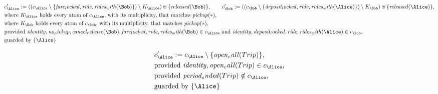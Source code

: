\begin{align*}
&
c'_
{
\Alice
}
 := 
(
(c_
{
\Alice
}
 \setminus 
\{
\mathit{
fare_locked
}
,
\mathit{
ride
}
,
\mathit{
rides_with
}
(
\Bob
)
\}
) \setminus K_
{
\Alice
}
) \uplus 
\{
\mathit{
released
}
(
\Bob
)
\}
, \qquad 
c'_
{
\Bob
}
 := 
(
(c_
{
\Bob
}
 \setminus 
\{
\mathit{
deposit_locked
}
,
\mathit{
ride
}
,
\mathit{
rides_with
}
(
\Alice
)
\}
) \setminus K_
{
\Bob
}
) \uplus 
\{
\mathit{
released
}
(
\Alice
)
\}
,\\
&
\text{where } K_
{
\Alice
}
 \text{ holds every atom of } c_
{
\Alice
}
 \text{, with its multiplicity, that matches } 
\mathit{
pickup
}
(
\ast
)
,\\
&
\text{where } K_
{
\Bob
}
 \text{ holds every atom of } c_
{
\Bob
}
 \text{, with its multiplicity, that matches } 
\mathit{
pickup
}
(
\ast
)
,\\
&
\text{provided } 
\mathit{
identity
}
,
\mathit{
no_pickup
}
,
\mathit{
cancel_release
}
(
\Bob
)
,
\mathit{
fare_locked
}
,
\mathit{
ride
}
,
\mathit{
rides_with
}
(
\Bob
)
 \in c_
{
\Alice
}
 \text{ and } 
\mathit{
identity
}
,
\mathit{
deposit_locked
}
,
\mathit{
ride
}
,
\mathit{
rides_with
}
(
\Alice
)
 \in c_
{
\Bob
}
,\\
&
\text{guarded by } \{
\Alice
\}
\end{align*}

\begin{align*}
&
c'_
{
\Alice
}
 := 
c_
{
\Alice
}
 \setminus 
\{
\mathit{
open_call
}
(
Trip
)
\}
,\\
&
\text{provided } 
\mathit{
identity
}
,
\mathit{
open_call
}
(
Trip
)
 \in c_
{
\Alice
}
,\\
&
\text{provided } 
\mathit{
period_ended
}
(
Trip
)
 \notin c_
{
\Alice
}
,\\
&
\text{guarded by } \{
\Alice
\}
\end{align*}
